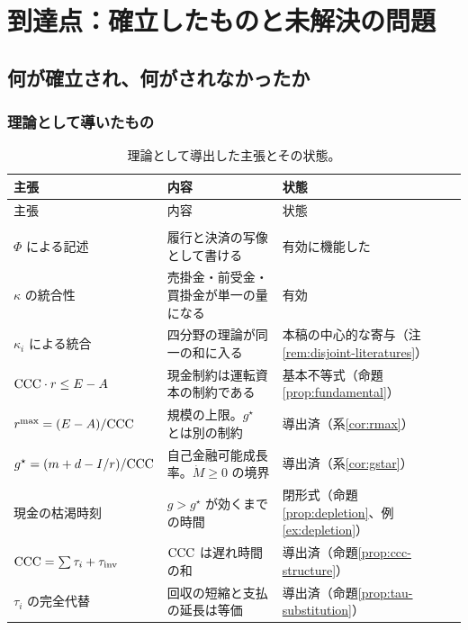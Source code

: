 \chapter{到達点：確立したものと未解決の問題}
\label{ch:conclusion}

\section{何が確立され、何がされなかったか}

\subsection{理論として導いたもの}

\begin{longtable}{@{}>{\raggedright\arraybackslash}p{}>{\raggedright\arraybackslash}p{}>{\raggedright\arraybackslash}p{}@{}}
\caption{理論として導出した主張とその状態。}\label{tab:theory-achievements}\\
\toprule
主張 & 内容 & 状態 \\
\midrule
\endfirsthead
\toprule
主張 & 内容 & 状態 \\
\midrule
\endhead
\midrule
\multicolumn{3}{r}{\footnotesize（次頁へ続く）}\\
\endfoot
\bottomrule
\endlastfoot
$\Phi$ による記述 & 履行と決済の写像として書ける & 有効に機能した \\
$\kappa$ の統合性 & 売掛金・前受金・買掛金が単一の量になる & 有効 \\
$\kappa_i$ による統合 & 四分野の理論が同一の和に入る & 本稿の中心的な寄与（注\ref{rem:disjoint-literatures}） \\
$\mathrm{CCC}\cdot r\leq E-A$ & 現金制約は運転資本の制約である & 基本不等式（命題\ref{prop:fundamental}） \\
$r^{\max}=(E-A)/\mathrm{CCC}$ & 規模の上限。$g^\star$ とは別の制約 & 導出済（系\ref{cor:rmax}） \\
$g^\star = (m+d-I/r)/\mathrm{CCC}$ & 自己金融可能成長率。$\dot M\geq 0$ の境界 & 導出済（系\ref{cor:gstar}） \\
現金の枯渇時刻 & $g>g^\star$ が効くまでの時間 & 閉形式（命題\ref{prop:depletion}、例\ref{ex:depletion}） \\
$\mathrm{CCC}=\sum\tau_i+\tau_{\mathrm{inv}}$ & $\mathrm{CCC}$ は遅れ時間の和 & 導出済（命題\ref{prop:ccc-structure}） \\
$\tau_i$ の完全代替 & 回収の短縮と支払の延長は等価 & 導出済（命題\ref{prop:tau-substitution}） \\

\end{longtable}

